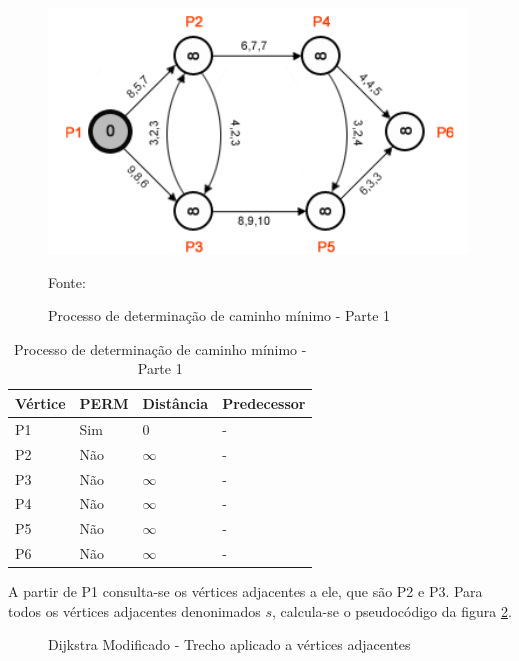 \begin{figure}[htbp]
\centering
 \includegraphics[width=.55\textwidth]{chapters/fig/leo2.png}
\caption{Processo de determinação de caminho mínimo - Parte 1}
Fonte: \cite{leonard}
\label{fig:leo2}
\end{figure}
\FloatBarrier
\begin{table}[htbp]
	\centering
	\begin{tabular}{l l l l}
	\toprule
	Vértice & PERM & Distância & Predecessor\\
	\midrule
	P1 & Sim & 0 & - \\
	P2 & Não & $\infty$ & - \\
	P3 & Não & $\infty$ & - \\
	P4 & Não & $\infty$ & - \\
	P5 & Não & $\infty$ & - \\
	P6 & Não & $\infty$ & - \\
	\bottomrule
	\end{tabular}
\caption{Processo de determinação de caminho mínimo - Parte 1}
 \label{tab:leotab1}
\end{table}

A partir de P1 consulta-se os vértices adjacentes a ele, que são P2 e P3. Para todos os vértices
adjacentes denonimados $s$, calcula-se o pseudocódigo da figura \ref{fig:diMod}.

\begin{figure}[htbp]
\centering
\caption{Dijkstra Modificado - Trecho aplicado a vértices adjacentes}
\label{fig:diMod}
\end{figure}

